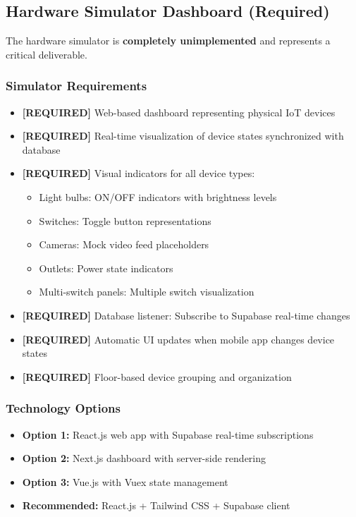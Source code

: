 \documentclass[12pt,a4paper]{article}
\begin{document}
\subsection{Hardware Simulator Dashboard (Required)}

The hardware simulator is \textbf{completely unimplemented} and represents a critical deliverable.

\subsubsection{Simulator Requirements}
\begin{itemize}[leftmargin=*]
    \item \textcolor{required}{\textbf{[REQUIRED]}} Web-based dashboard representing physical IoT devices
    \item \textcolor{required}{\textbf{[REQUIRED]}} Real-time visualization of device states synchronized with database
    \item \textcolor{required}{\textbf{[REQUIRED]}} Visual indicators for all device types:
    \begin{itemize}
        \item Light bulbs: ON/OFF indicators with brightness levels
        \item Switches: Toggle button representations
        \item Cameras: Mock video feed placeholders
        \item Outlets: Power state indicators
        \item Multi-switch panels: Multiple switch visualization
    \end{itemize}
    \item \textcolor{required}{\textbf{[REQUIRED]}} Database listener: Subscribe to Supabase real-time changes
    \item \textcolor{required}{\textbf{[REQUIRED]}} Automatic UI updates when mobile app changes device states
    \item \textcolor{required}{\textbf{[REQUIRED]}} Floor-based device grouping and organization
\end{itemize}

\subsubsection{Technology Options}
\begin{itemize}[leftmargin=*]
    \item \textbf{Option 1:} React.js web app with Supabase real-time subscriptions
    \item \textbf{Option 2:} Next.js dashboard with server-side rendering
    \item \textbf{Option 3:} Vue.js with Vuex state management
    \item \textbf{Recommended:} React.js + Tailwind CSS + Supabase client
\end{itemize}
\end{document}
